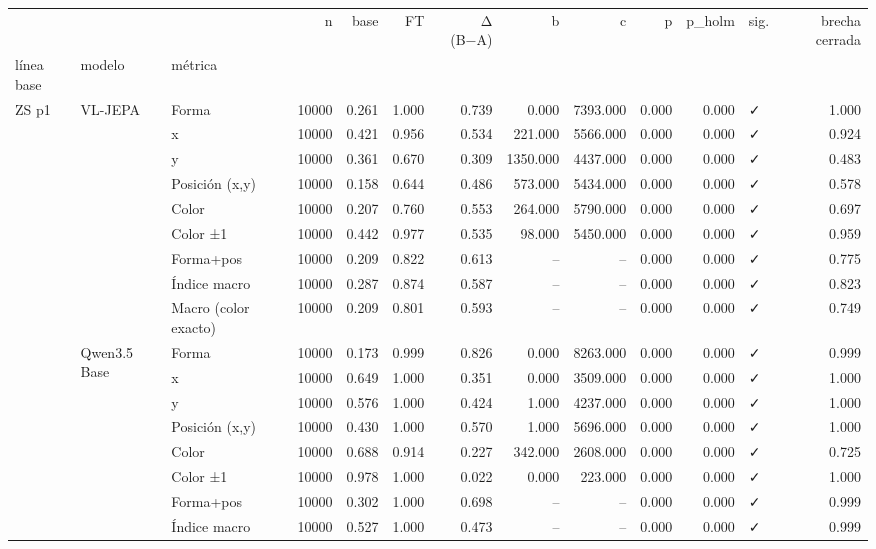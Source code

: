 \begin{tabular}{lllrrrrrrrrlr}
\toprule
 &  &  & n & base & FT & Δ (B−A) & b & c & p & p\_holm & sig. & brecha cerrada \\
línea base & modelo & métrica &  &  &  &  &  &  &  &  &  &  \\
\midrule
\multirow[t]{36}{*}{ZS p1} & \multirow[t]{9}{*}{VL-JEPA} & Forma & 10000 & 0.261 & 1.000 & 0.739 & 0.000 & 7393.000 & 0.000 & 0.000 & ✓ & 1.000 \\
 &  & x & 10000 & 0.421 & 0.956 & 0.534 & 221.000 & 5566.000 & 0.000 & 0.000 & ✓ & 0.924 \\
 &  & y & 10000 & 0.361 & 0.670 & 0.309 & 1350.000 & 4437.000 & 0.000 & 0.000 & ✓ & 0.483 \\
 &  & Posición (x,y) & 10000 & 0.158 & 0.644 & 0.486 & 573.000 & 5434.000 & 0.000 & 0.000 & ✓ & 0.578 \\
 &  & Color & 10000 & 0.207 & 0.760 & 0.553 & 264.000 & 5790.000 & 0.000 & 0.000 & ✓ & 0.697 \\
 &  & Color ±1 & 10000 & 0.442 & 0.977 & 0.535 & 98.000 & 5450.000 & 0.000 & 0.000 & ✓ & 0.959 \\
 &  & Forma+pos & 10000 & 0.209 & 0.822 & 0.613 & -- & -- & 0.000 & 0.000 & ✓ & 0.775 \\
 &  & Índice macro & 10000 & 0.287 & 0.874 & 0.587 & -- & -- & 0.000 & 0.000 & ✓ & 0.823 \\
 &  & Macro (color exacto) & 10000 & 0.209 & 0.801 & 0.593 & -- & -- & 0.000 & 0.000 & ✓ & 0.749 \\
\cline{2-13}
 & \multirow[t]{9}{*}{Qwen3.5 Base} & Forma & 10000 & 0.173 & 0.999 & 0.826 & 0.000 & 8263.000 & 0.000 & 0.000 & ✓ & 0.999 \\
 &  & x & 10000 & 0.649 & 1.000 & 0.351 & 0.000 & 3509.000 & 0.000 & 0.000 & ✓ & 1.000 \\
 &  & y & 10000 & 0.576 & 1.000 & 0.424 & 1.000 & 4237.000 & 0.000 & 0.000 & ✓ & 1.000 \\
 &  & Posición (x,y) & 10000 & 0.430 & 1.000 & 0.570 & 1.000 & 5696.000 & 0.000 & 0.000 & ✓ & 1.000 \\
 &  & Color & 10000 & 0.688 & 0.914 & 0.227 & 342.000 & 2608.000 & 0.000 & 0.000 & ✓ & 0.725 \\
 &  & Color ±1 & 10000 & 0.978 & 1.000 & 0.022 & 0.000 & 223.000 & 0.000 & 0.000 & ✓ & 1.000 \\
 &  & Forma+pos & 10000 & 0.302 & 1.000 & 0.698 & -- & -- & 0.000 & 0.000 & ✓ & 0.999 \\
 &  & Índice macro & 10000 & 0.527 & 1.000 & 0.473 & -- & -- & 0.000 & 0.000 & ✓ & 0.999 \\

\end{tabular}
